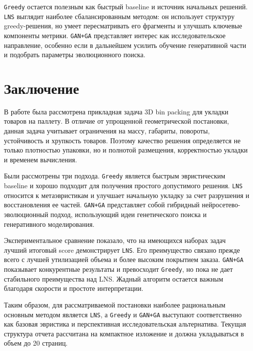 \documentclass[14pt,a4paper]{extarticle}
\begin{document}
\texttt{Greedy} остается полезным как быстрый baseline и источник начальных решений. \texttt{LNS} выглядит наиболее сбалансированным методом: он использует структуру greedy-решения, но умеет пересматривать его фрагменты и улучшать ключевые компоненты метрики. \texttt{GAN+GA} представляет интерес как исследовательское направление, особенно если в дальнейшем усилить обучение генеративной части и подобрать параметры эволюционного поиска.

\pagebreak

\section{Заключение}

В работе была рассмотрена прикладная задача 3D bin packing для укладки товаров на паллету. В отличие от упрощенной геометрической постановки, данная задача учитывает ограничения на массу, габариты, повороты, устойчивость и хрупкость товаров. Поэтому качество решения определяется не только плотностью упаковки, но и полнотой размещения, корректностью укладки и временем вычисления.

Были рассмотрены три подхода. \texttt{Greedy} является быстрым эвристическим baseline и хорошо подходит для получения простого допустимого решения. \texttt{LNS} относится к метаэвристикам и улучшает начальную укладку за счет разрушения и восстановления ее частей. \texttt{GAN+GA} представляет собой гибридный нейросетево-эволюционный подход, использующий идеи генетического поиска и генеративного моделирования.

Экспериментальное сравнение показало, что на имеющихся наборах задач лучший итоговый score демонстрирует \texttt{LNS}. Его преимущество связано прежде всего с лучшей утилизацией объема и более высоким покрытием заказа. \texttt{GAN+GA} показывает конкурентные результаты и превосходит \texttt{Greedy}, но пока не дает стабильного преимущества над LNS. Жадный алгоритм остается важным благодаря скорости и простоте интерпретации.

Таким образом, для рассматриваемой постановки наиболее рациональным основным методом является \texttt{LNS}, а \texttt{Greedy} и \texttt{GAN+GA} выступают соответственно как базовая эвристика и перспективная исследовательская альтернатива. Текущая структура отчета рассчитана на компактное изложение и должна укладываться в объем до 20 страниц.

\pagebreak
\end{document}
